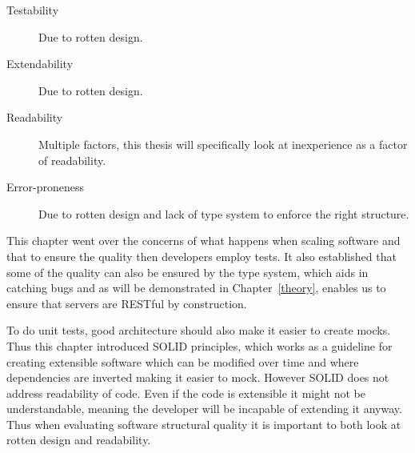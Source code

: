 \begin{description}
    \item[Testability] Due to rotten design.
    \item[Extendability] Due to rotten design.
    \item[Readability] Multiple factors, this thesis will specifically look at 
		inexperience as a factor of readability.
    \item[Error-proneness] Due to rotten design and lack of type system to
        enforce the right structure.
\end{description}

This chapter went over the concerns of what happens when scaling software and
that to ensure the quality then developers employ tests. It also established
that some of the quality can also be ensured by the type system, which aids in
catching bugs and as will be demonstrated in Chapter~\ref{theory}, enables us
to ensure that servers are RESTful by construction. 

To do unit tests, good architecture should also make it easier to create mocks.
Thus this chapter introduced SOLID principles, which works as a guideline for
creating extensible software which can be modified over time and where
dependencies are inverted making it easier to mock. However SOLID does not
address readability of code. Even if the code is extensible it might not be
understandable, meaning the developer will be incapable of extending it anyway.
Thus when evaluating software structural quality it is important to both look
at rotten design and readability.
